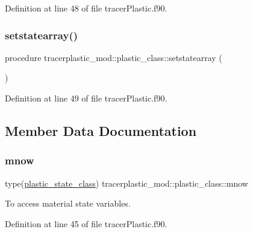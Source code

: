 Definition at line 48 of file tracer\+Plastic.\+f90.

\mbox{\label{structtracerplastic__mod_1_1plastic__class_ae42b613c9b924bc54f278c1361ca59e3}} 
\subsubsection{\texorpdfstring{setstatearray()}{setstatearray()}}
{\footnotesize\ttfamily procedure tracerplastic\+\_\+mod\+::plastic\+\_\+class\+::setstatearray (\begin{DoxyParamCaption}{ }\end{DoxyParamCaption})\hspace{0.3cm}{\ttfamily [private]}}



Definition at line 49 of file tracer\+Plastic.\+f90.



\subsection{Member Data Documentation}
\mbox{\label{structtracerplastic__mod_1_1plastic__class_aa2e33df26e814fa1380e8184c54ee42e}} 
\subsubsection{\texorpdfstring{mnow}{mnow}}
{\footnotesize\ttfamily type(\mbox{\hyperlink{structtracerplastic__mod_1_1plastic__state__class}{plastic\+\_\+state\+\_\+class}}) tracerplastic\+\_\+mod\+::plastic\+\_\+class\+::mnow\hspace{0.3cm}{\ttfamily [private]}}



To access material state variables. 



Definition at line 45 of file tracer\+Plastic.\+f90.


